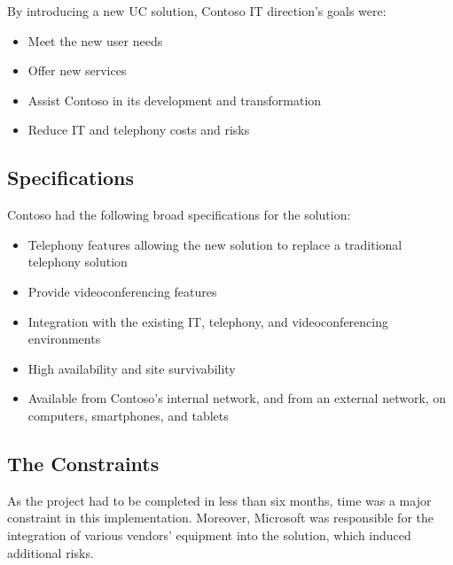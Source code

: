 	By introducing a new UC solution, Contoso IT direction's goals were:
	\begin{itemize}
		\item Meet the new user needs
		\item Offer new services
		\item Assist Contoso in its development and transformation
		\item Reduce IT and telephony costs and risks
	\end{itemize}

		
\subsection{Specifications}
	Contoso had the following broad specifications for the solution:
	\begin{itemize}
		\item Telephony features allowing the new solution to replace a traditional telephony solution
		\item Provide videoconferencing features
		\item Integration with the existing IT, telephony, and videoconferencing environments
		\item High availability and site survivability
		\item Available from Contoso's internal network, and from an external network, on computers, smartphones, and tablets
	\end{itemize}

\subsection{The Constraints}
	As the project had to be completed in less than six months, time was a major constraint in this implementation.
	Moreover, Microsoft was responsible for the integration of various vendors' equipment into the solution, which induced additional risks.

